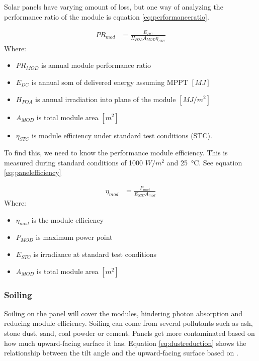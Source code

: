 Solar panels have varying amount of loss, but one way of analyzing the performance ratio of the module is equation \eqref{eq:performanceratio}.

\begin{align}
    PR_{mod} & = \frac{E_{DC}}{H_{POA}A_{MOD}\eta_{STC}}
    \label{eq:performanceratio}
\end{align}
Where:
\begin{itemize}
    \item $PR_{MOD}$ is annual module performance ratio
    \item $E_{DC}$ is annual som of delivered energy assuming MPPT $[MJ]$
    \item $H_{POA}$ is annual irradiation into plane of the module $[MJ/m^2]$
    \item $A_{MOD}$ is total module area $[m^2]$
    \item $\eta_{STC}$ is module efficiency under standard test conditions (STC).
\end{itemize}

To find this, we need to know the performance module efficiency. This is measured during standard conditions of 1000 $W/m^2$ and \SI{25}{\celsius}. See equation \eqref{eq:panelefficiency}

\begin{align}
    \eta_{mod} &= \frac{P_{mod}}{E_{STC}A_{mod}}
    \label{eq:panelefficiency}
\end{align}
Where:
\begin{itemize}
    \item $\eta_{mod}$ is the module efficiency
    \item $P_{MOD}$ is maximum power point
    \item $E_{STC}$ is irradiance at standard test conditions
    \item $A_{MOD}$ is total module area $[m^2]$
\end{itemize}

\subsubsection{Soiling}
Soiling on the panel will cover the modules, hindering photon absorption and reducing module efficiency. Soiling can come from several pollutants such as ash, stone dust, sand, coal powder or cement. Panels get more contaminated based on how much upward-facing surface it has. Equation \eqref{eq:dustreduction} shows the relationship between the tilt angle and the upward-facing surface based on \citep{yakubuHolisticReviewEffects2025}.

